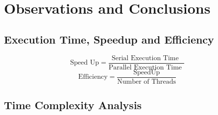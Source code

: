 \documentclass{article}
\newcommand{\cpp}{\lstinline[language=C++]}
\begin{document}
    
    
    \section{Observations and Conclusions}
    \subsection{Execution Time, Speedup and Efficiency}
    
    $$\text{Speed Up}=\frac{\text{Serial Execution Time }}{\text{Parallel Execution Time }}$$
    $$\text{Efficiency}=\frac{\text{SpeedUp}}{\text{Number of Threads}}$$
    
    
    \subsection{Time Complexity Analysis}
    
\end{document}
